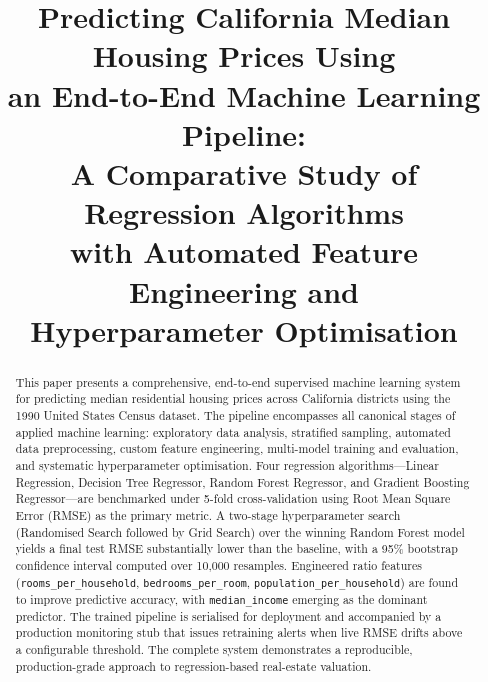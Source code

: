 \documentclass[conference]{IEEEtran}
\begin{document}
\title{%
  Predicting California Median Housing Prices Using\\
  an End-to-End Machine Learning Pipeline:\\
  A Comparative Study of Regression Algorithms\\
  with Automated Feature Engineering and\\
  Hyperparameter Optimisation
}

\author{%
}

\maketitle

\begin{abstract}
This paper presents a comprehensive, end-to-end supervised machine learning system for predicting median residential housing prices across California districts using the 1990 United States Census dataset. The pipeline encompasses all canonical stages of applied machine learning: exploratory data analysis, stratified sampling, automated data preprocessing, custom feature engineering, multi-model training and evaluation, and systematic hyperparameter optimisation. Four regression algorithms—Linear Regression, Decision Tree Regressor, Random Forest Regressor, and Gradient Boosting Regressor—are benchmarked under 5-fold cross-validation using Root Mean Square Error (RMSE) as the primary metric. A two-stage hyperparameter search (Randomised Search followed by Grid Search) over the winning Random Forest model yields a final test RMSE substantially lower than the baseline, with a 95\% bootstrap confidence interval computed over 10,000 resamples. Engineered ratio features (\texttt{rooms\_per\_household}, \texttt{bedrooms\_per\_room}, \texttt{population\_per\_household}) are found to improve predictive accuracy, with \texttt{median\_income} emerging as the dominant predictor. The trained pipeline is serialised for deployment and accompanied by a production monitoring stub that issues retraining alerts when live RMSE drifts above a configurable threshold. The complete system demonstrates a reproducible, production-grade approach to regression-based real-estate valuation.
\end{abstract}
\end{document}
